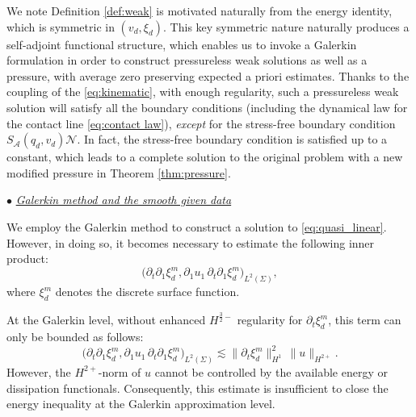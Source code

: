 \documentclass[letterpaper,reqno,10pt,twoside]{amsart}
\theoremstyle{definition}
\theoremstyle{remark}
\begin{document}
	We note  Definition \ref{def:weak} is motivated naturally from the energy identity, which is symmetric  in $(v_d,\xi_d)$. This key symmetric nature naturally produces a self-adjoint functional structure, which  enables us to invoke a Galerkin formulation in order to construct pressureless weak solutions as well as a pressure, with average zero preserving expected a priori estimates. Thanks to the coupling of the \eqref{eq:kinematic}, with enough regularity, such a pressureless weak solution will satisfy all the boundary conditions (including the dynamical law for the contact line \eqref{eq:contact law}), \textit{except} for the stress-free boundary condition $S_{\mathcal{A}}(q_d, v_d)\mathcal{N}$. In fact, the stress-free boundary condition is satisfied up to a constant, which leads to a complete solution to the original problem with a new modified pressure in Theorem \ref{thm:pressure}.
	
	
	
	\noindent $\bullet$ \underline{\textsl{Galerkin method and the smooth given data}}
	
	We employ the Galerkin method to construct a solution to \eqref{eq:quasi_linear}. However, in doing so, it becomes necessary to estimate the following inner product:
	\[
	\bigl(\partial_{t}\partial_{1}\xi_{d}^{m},
	\partial_{1}u_{1}\,\partial_{t}\partial_{1}\xi_{d}^{m}\bigr)_{L^{2}(\Sigma)},
	\]
	where $\xi_{d}^{m}$ denotes the discrete surface function.
	
	At the Galerkin level, without enhanced $H^{\frac{3}{2}-}$ regularity for $\partial_{t}\xi_{d}^{m}$, this term can only be bounded as follows:
	\[
	\bigl(\partial_{t}\partial_{1}\xi_{d}^{m},
	\partial_{1}u_{1}\,\partial_{t}\partial_{1}\xi_{d}^{m}\bigr)_{L^{2}(\Sigma)}
	\lesssim
	\|\partial_{t}\xi_{d}^{m}\|_{H^{1}}^{2}\,
	\|u\|_{H^{2+}}.
	\]
	However, the $H^{2+}$-norm of $u$ cannot be controlled by the available energy or dissipation functionals. Consequently, this estimate is insufficient to close the energy inequality at the Galerkin approximation level.
	
\end{document}
